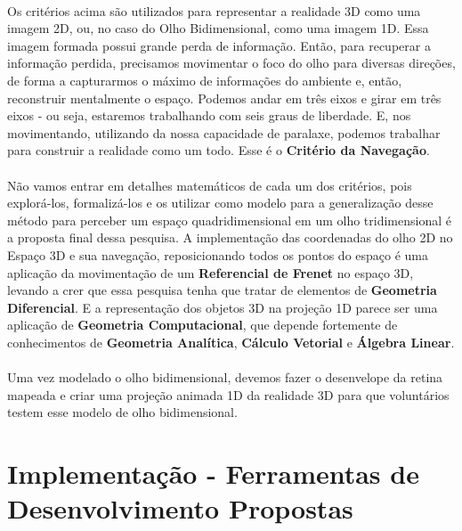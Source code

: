 \documentclass{article}
\begin{document}
	\paragraph{}
	Os critérios acima são utilizados para representar a realidade 3D como uma imagem 2D, ou, no caso do Olho Bidimensional, como uma imagem 1D. Essa imagem formada possui grande perda de informação. Então, para recuperar a informação perdida, precisamos movimentar o foco do olho para diversas direções, de forma a capturarmos o máximo de informações do ambiente e, então, reconstruir mentalmente o espaço. Podemos andar em três eixos e girar em três eixos - ou seja, estaremos trabalhando com seis graus de liberdade. E, nos movimentando, utilizando da nossa capacidade de paralaxe, podemos trabalhar para construir a realidade como um todo. Esse é o \textbf{Critério da Navegação}.
	
	\paragraph{}
	Não vamos entrar em detalhes matemáticos de cada um dos critérios, pois explorá-los, formalizá-los e os utilizar como modelo para a generalização desse método para perceber um espaço quadridimensional em um olho tridimensional é a proposta final dessa pesquisa. A implementação das coordenadas do olho 2D no Espaço 3D e sua navegação, reposicionando todos os pontos do espaço é uma aplicação da movimentação de um \textbf{Referencial de Frenet} no espaço 3D, levando a crer que essa pesquisa tenha que tratar de elementos de \textbf{Geometria Diferencial}. E a representação dos objetos 3D na projeção 1D parece ser uma aplicação de \textbf{Geometria Computacional}, que depende fortemente de conhecimentos de \textbf{Geometria Analítica}, \textbf{Cálculo Vetorial} e \textbf{Álgebra Linear}.
	
	\paragraph{}
	Uma vez modelado o olho bidimensional, devemos fazer o desenvelope da retina mapeada e criar uma projeção animada 1D da realidade 3D para que voluntários testem esse modelo de olho bidimensional. 
		
	\section{Implementação - Ferramentas de Desenvolvimento Propostas} \label{if}
	
\end{document}
